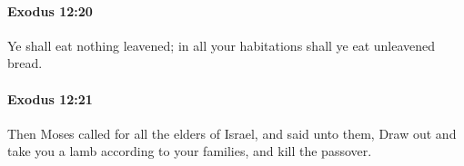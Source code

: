 		\paragraph{Exodus 12:20} %
			\label{EXODUS-12-20}

			Ye shall eat nothing leavened; in all your habitations shall ye eat unleavened bread.


		\paragraph{Exodus 12:21} %
			\label{EXODUS-12-21}

			Then Moses called for all the elders of Israel, and said unto them, Draw out and take you a lamb according to your families, and kill the passover.


